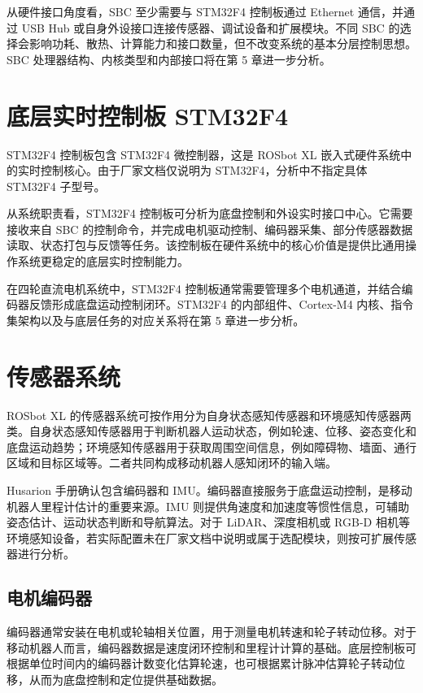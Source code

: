 \documentclass[UTF8,a4paper,12pt]{ctexrep}
\begin{document}
从硬件接口角度看，SBC 至少需要与 STM32F4 控制板通过 Ethernet 通信，并通过 USB Hub 或自身外设接口连接传感器、调试设备和扩展模块。不同 SBC 的选择会影响功耗、散热、计算能力和接口数量，但不改变系统的基本分层控制思想。SBC 处理器结构、内核类型和内部接口将在第 5 章进一步分析。

\section{底层实时控制板 STM32F4}

STM32F4 控制板包含 STM32F4 微控制器，这是 ROSbot XL 嵌入式硬件系统中的实时控制核心。由于厂家文档仅说明为 STM32F4，分析中不指定具体 STM32F4 子型号。

从系统职责看，STM32F4 控制板可分析为底盘控制和外设实时接口中心。它需要接收来自 SBC 的控制命令，并完成电机驱动控制、编码器采集、部分传感器数据读取、状态打包与反馈等任务。该控制板在硬件系统中的核心价值是提供比通用操作系统更稳定的底层实时控制能力。

在四轮直流电机系统中，STM32F4 控制板通常需要管理多个电机通道，并结合编码器反馈形成底盘运动控制闭环。STM32F4 的内部组件、Cortex-M4 内核、指令集架构以及与底层任务的对应关系将在第 5 章进一步分析。

\section{传感器系统}

ROSbot XL 的传感器系统可按作用分为自身状态感知传感器和环境感知传感器两类。自身状态感知传感器用于判断机器人运动状态，例如轮速、位移、姿态变化和底盘运动趋势；环境感知传感器用于获取周围空间信息，例如障碍物、墙面、通行区域和目标区域等。二者共同构成移动机器人感知闭环的输入端。

Husarion 手册确认包含编码器和 IMU。编码器直接服务于底盘运动控制，是移动机器人里程计估计的重要来源。IMU 则提供角速度和加速度等惯性信息，可辅助姿态估计、运动状态判断和导航算法。对于 LiDAR、深度相机或 RGB-D 相机等环境感知设备，若实际配置未在厂家文档中说明或属于选配模块，则按可扩展传感器进行分析。

\subsection{电机编码器}

编码器通常安装在电机或轮轴相关位置，用于测量电机转速和轮子转动位移。对于移动机器人而言，编码器数据是速度闭环控制和里程计计算的基础。底层控制板可根据单位时间内的编码器计数变化估算轮速，也可根据累计脉冲估算轮子转动位移，从而为底盘控制和定位提供基础数据。
\end{document}

